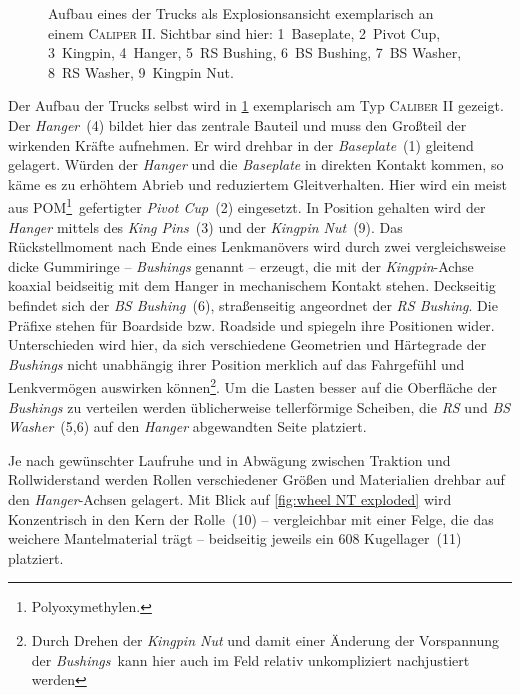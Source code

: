 		\begin{figure}[h]
			\centering
			
			\caption[Explosionsansicht eines der Trucks]{Aufbau eines der Trucks als Explosionsansicht exemplarisch an einem \textsc{Caliper II}. Sichtbar sind hier: 1~Baseplate, 2~Pivot Cup, 3~Kingpin, 4~Hanger, 5~RS Bushing, 6~BS Bushing, 7~BS Washer, 8~RS Washer, 9~Kingpin Nut.}
			\label{fig:caliper exploded}
		\end{figure}
		Der Aufbau der Trucks selbst wird in \cref{fig:caliper exploded} exemplarisch am Typ \textsc{Caliber II} gezeigt.
		Der \textit{Hanger}~(4) bildet hier das zentrale Bauteil und muss den Großteil der wirkenden Kräfte aufnehmen.
		Er wird drehbar in der \textit{Baseplate}~(1) gleitend gelagert.
		Würden der \textit{Hanger} und die \textit{Baseplate} in direkten Kontakt kommen, so käme es zu erhöhtem Abrieb und reduziertem Gleitverhalten.
		Hier wird ein meist aus POM\footnote{Polyoxymethylen.}~gefertigter \textit{Pivot Cup}~(2) eingesetzt.
		In Position gehalten wird der \textit{Hanger} mittels des \textit{King Pins}~(3) und der \textit{Kingpin Nut}~(9).
		Das Rückstellmoment nach Ende eines Lenkmanövers wird durch zwei vergleichsweise dicke Gummiringe -- \textit{Bushings} genannt -- erzeugt, die mit der \textit{Kingpin}-Achse koaxial beidseitig mit dem Hanger in mechanischem Kontakt stehen.
		Deckseitig befindet sich der \textit{BS Bushing}~(6), straßenseitig angeordnet der \textit{RS Bushing}.
		Die Präfixe stehen für Boardside bzw. Roadside und spiegeln ihre Positionen wider.
		Unterschieden wird hier, da sich verschiedene Geometrien und Härtegrade der \textit{Bushings} nicht unabhängig ihrer Position merklich auf das Fahrgefühl und Lenkvermögen auswirken können\footnote{Durch Drehen der \textit{Kingpin Nut} und damit einer Änderung der Vorspannung der \textit{Bushings}~kann hier auch im Feld relativ unkompliziert nachjustiert werden}.
		Um die Lasten besser auf die Oberfläche der \textit{Bushings} zu verteilen werden üblicherweise tellerförmige Scheiben, die \textit{RS} und \textit{BS Washer}~(5,6) auf den \textit{Hanger} abgewandten Seite platziert.\par\medskip
		Je nach gewünschter Laufruhe und in Abwägung zwischen Traktion und Rollwiderstand werden Rollen verschiedener Größen und Materialien drehbar auf den \textit{Hanger}-Achsen gelagert.
		Mit Blick auf \cref{fig:wheel NT exploded} wird Konzentrisch in den Kern der Rolle~(10) -- vergleichbar mit einer Felge, die das weichere Mantelmaterial trägt -- beidseitig jeweils ein 608 Kugellager~(11) platziert.
